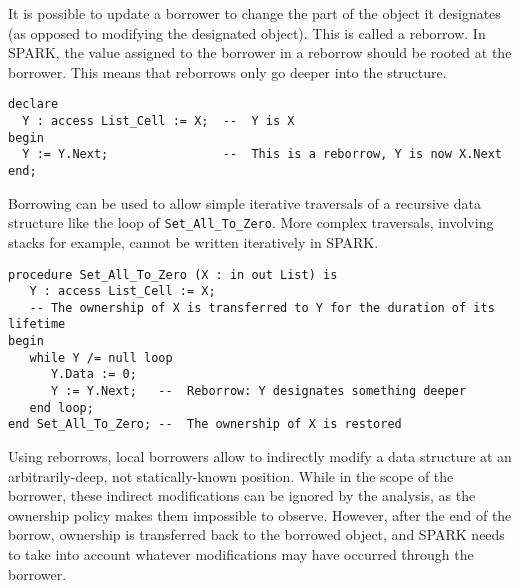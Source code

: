 \documentclass[runningheads]{llncs}
\begin{document}
It is possible to update a borrower to change the part of the object it designates (as opposed to modifying the designated object). This is called a reborrow. In SPARK, the value assigned to the borrower in a reborrow should be rooted at the borrower. This means that reborrows only go deeper into the structure.
\begin{lstlisting}
declare
  Y : access List_Cell := X;  --  Y is X
begin
  Y := Y.Next;                --  This is a reborrow, Y is now X.Next
end;
\end{lstlisting}
Borrowing can be used to allow simple iterative traversals of a recursive data structure like the loop of \texttt{Set\_All\_To\_Zero}. More complex traversals, involving stacks for example, cannot be written iteratively in SPARK.
\begin{lstlisting}
procedure Set_All_To_Zero (X : in out List) is
   Y : access List_Cell := X;
   -- The ownership of X is transferred to Y for the duration of its lifetime
begin
   while Y /= null loop
      Y.Data := 0;
      Y := Y.Next;   --  Reborrow: Y designates something deeper
   end loop;
end Set_All_To_Zero; --  The ownership of X is restored
\end{lstlisting}
Using reborrows, local borrowers allow to indirectly modify a data structure at an arbitrarily-deep, not statically-known position. While in the scope of the borrower, these indirect modifications can be ignored by the analysis, as the ownership policy makes them impossible to observe. However, after the end of the borrow, ownership is transferred back to the borrowed object, and SPARK needs to take into account whatever modifications may have occurred through the borrower.
\end{document}
